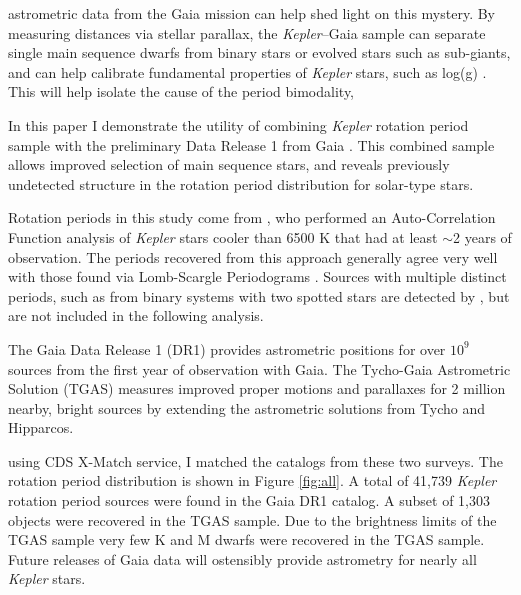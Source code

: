 \documentclass[manuscript, letterpaper]{aastex6}
\makeatletter
\let\origsection\section
\renewcommand\section{\@ifstar{\starsection}{\nostarsection}}
\newcommand\nostarsection[1]{\sectionprelude\origsection{#1}}
\newcommand\starsection[1]{\sectionprelude\origsection*{#1}}
\newcommand\sectionprelude{\vspace{1em}}
\newcommand{\Kepler}{\textsl{Kepler}\xspace}
\makeatother
\begin{document}
astrometric data from the Gaia mission \citep{gaia} can help shed light on this mystery. By measuring distances via stellar parallax, the \Kepler--Gaia sample can separate single main sequence dwarfs from binary stars or evolved stars such as sub-giants, and can help calibrate fundamental properties of \Kepler stars, such as log(g) \citep{creevey2013}. This will help isolate the cause of the period bimodality,
 

In this paper I demonstrate the utility of combining \Kepler rotation period sample with the preliminary Data Release 1 from Gaia \citep{gaia_dr1}. This combined sample allows improved selection of main sequence stars, and reveals previously undetected structure in the rotation period distribution for solar-type stars.





\section{The \Kepler--Gaia Data}
Rotation periods in this study come from \citet{mcquillan2014}, who performed an Auto-Correlation Function analysis of \Kepler stars cooler than 6500 K that had at least $\sim$2 years of observation. The periods recovered from this approach generally agree very well with those found via Lomb-Scargle Periodograms \citep[e.g.][]{aigrain2015}. Sources with multiple distinct periods, such as from binary systems with two spotted stars \citep[e.g.][]{lurie2015} are detected by \citet{mcquillan2014}, but are not included in the following analysis.

The Gaia Data Release 1 (DR1) provides astrometric positions for over $10^9$ sources from the first year of observation with Gaia. The Tycho-Gaia Astrometric Solution (TGAS) measures improved proper motions and parallaxes for 2 million nearby, bright sources by extending the astrometric solutions from Tycho and Hipparcos.


using CDS X-Match service, I matched the catalogs from these two surveys. The rotation period distribution is shown in Figure \ref{fig:all}. A total of 41,739 \Kepler rotation period sources were found in the Gaia DR1 catalog. A subset of 1,303 objects were recovered in the TGAS sample. Due to the brightness limits of the TGAS sample very few K and M dwarfs were recovered in the TGAS sample. Future releases of Gaia data will ostensibly provide astrometry for nearly all \Kepler stars.
\end{document}
